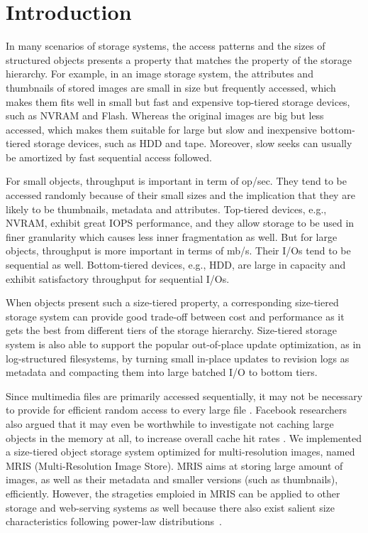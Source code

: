 \section{Introduction}
\label{intro}

In many scenarios of storage systems, the access patterns and the
sizes of structured objects presents a property that matches the
property of the storage hierarchy. For example, in an image storage
system, the attributes and thumbnails of stored images are small in
size but frequently accessed, which makes them fits well in small but
fast and expensive top-tiered storage devices, such as NVRAM and
Flash.  Whereas the original images are big but less accessed, which
makes them suitable for large but slow and inexpensive bottom-tiered
storage devices, such as HDD and tape.  Moreover, slow seeks can
usually be amortized by fast sequential access followed.

For small objects, throughput is important in term of op/sec. They
tend to be accessed randomly because of their small sizes and the
implication that they are likely to be thumbnails, metadata and
attributes.  Top-tiered devices, e.g., NVRAM, exhibit great IOPS
performance, and they allow storage to be used in finer granularity
which causes less inner fragmentation as well. But for large objects,
throughput is more important in terms of mb/s. Their I/Os tend to be
sequential as well. Bottom-tiered devices, e.g., HDD, are large in
capacity and exhibit satisfactory throughput for sequential I/Os. 

When objects present such a size-tiered property, a corresponding
size-tiered storage system can provide good trade-off between cost and
performance as it gets the best from different tiers of the storage
hierarchy. Size-tiered storage system is also able to support the
popular out-of-place update optimization, as in log-structured
filesystems, by turning small in-place updates to revision logs as
metadata and compacting them into large batched I/O to bottom tiers.

Since multimedia files are primarily accessed sequentially, it may not
be necessary to provide for efficient random access to every large
file \cite{evans2002study}.  Facebook researchers also argued that it
may even be worthwhile to investigate not caching large objects in the
memory at all, to increase overall cache hit rates
\cite{kvworkload_sigmetrics}.  We implemented a size-tiered object
storage system optimized for multi-resolution images, named MRIS
(Multi-Resolution Image Store).  MRIS aims at storing large amount of
images, as well as their metadata and smaller versions (such as
thumbnails), efficiently. However, the strageties emploied in MRIS can
be applied to other storage and web-serving systems as well because
there also exist salient size characteristics following power-law
distributions~\cite{kvworkload_sigmetrics}.

